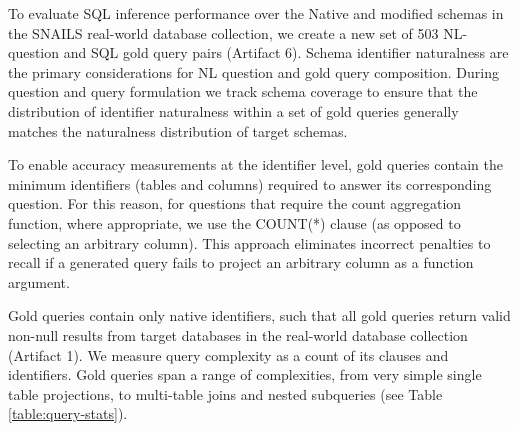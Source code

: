 To evaluate SQL inference performance over the Native and modified schemas in the SNAILS real-world database collection, we create a new set of 503 NL-question and SQL gold query pairs (Artifact 6).
Schema identifier naturalness are the primary considerations for NL question and gold query composition.
During question and query formulation we track schema coverage to ensure that the distribution of identifier naturalness within a set of gold queries generally matches the naturalness distribution of target schemas.

To enable accuracy measurements at the identifier level, gold queries contain the minimum identifiers (tables and columns) required to answer its corresponding question.
For this reason, for questions that require the count aggregation function, where appropriate, we use the COUNT(*) clause (as opposed to selecting an arbitrary column).
This approach eliminates incorrect penalties to recall if a generated query fails to project an arbitrary column as a function argument.

Gold queries contain only native identifiers, such that all gold queries return valid non-null results from target databases in the real-world database collection (Artifact 1).
We measure query complexity as a count of its clauses and identifiers.
Gold queries span a range of complexities, from very simple single table projections, to multi-table joins and nested subqueries (see Table \ref{table:query-stats}).

